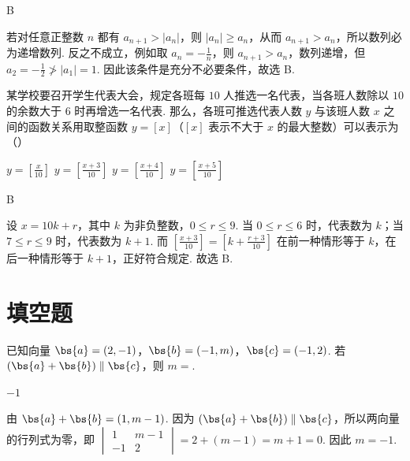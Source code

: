 \begin{answer}
B
\end{answer}

\begin{solution}
若对任意正整数 \(n\) 都有 \(a_{n+1}>|a_n|\)，则 \(|a_n|\geqslant a_n\)，从而 \(a_{n+1}>a_n\)，所以数列必为递增数列. 反之不成立，例如取 \(a_n=-\frac1n\)，则 \(a_{n+1}>a_n\)，数列递增，但 \(a_2=-\frac12\not>|a_1|=1\). 因此该条件是充分不必要条件，故选 B.
\end{solution}

\begin{problem}
某学校要召开学生代表大会，规定各班每 \(10\) 人推选一名代表，当各班人数除以 \(10\) 的余数大于 \(6\) 时再增选一名代表. 那么，各班可推选代表人数 \(y\) 与该班人数 \(x\) 之间的函数关系用取整函数 \(y = [x]\)（\([x]\) 表示不大于 \(x\) 的最大整数）可以表示为（\quad）

\choices
    {\(y = \left[\frac{x}{10}\right]\)}
    {\(y = \left[\frac{x + 3}{10}\right]\)}
    {\(y = \left[\frac{x + 4}{10}\right]\)}
    {\(y = \left[\frac{x + 5}{10}\right]\)}
\end{problem}

\begin{answer}
B
\end{answer}

\begin{solution}
设 \(x=10k+r\)，其中 \(k\) 为非负整数，\(0\leqslant r\leqslant9\). 当 \(0\leqslant r\leqslant6\) 时，代表数为 \(k\)；当 \(7\leqslant r\leqslant9\) 时，代表数为 \(k+1\). 而 \(\left[\frac{x+3}{10}\right]=\left[k+\frac{r+3}{10}\right]\) 在前一种情形等于 \(k\)，在后一种情形等于 \(k+1\)，正好符合规定. 故选 B.
\end{solution}

\section{填空题}

\begin{problem}
已知向量 \(\bs{a} = (2, -1)\)，\(\bs{b} = (-1, m)\)，\(\bs{c} = (-1, 2)\). 若 \((\bs{a} + \bs{b}) \parallel \bs{c}\)，则 \(m = \)\fillinblank{}.
\end{problem}

\begin{answer}
\(-1\)
\end{answer}

\begin{solution}
由 \(\bs{a}+\bs{b}=(1,m-1)\). 因为 \((\bs{a}+\bs{b})\parallel\bs{c}\)，所以两向量的行列式为零，即 \(\begin{vmatrix}1&m-1\\-1&2\end{vmatrix}=2+(m-1)=m+1=0\). 因此 \(m=-1\).
\end{solution}

